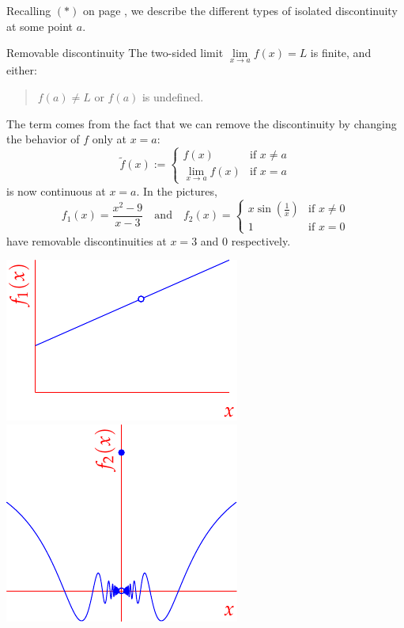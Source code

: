 Recalling $(\ast)$ on page \pageref{it:contlimit}, we describe the different types of isolated discontinuity at some point $a$.
\begin{description}
	\begin{minipage}[t]{0.65\linewidth}\vspace{0pt}
	\item[Removable discontinuity] The two-sided limit $\lim\limits_{x\to a}f(x)=L$ is finite, and either:
	\begin{quote}
	  $f(a)\neq L$ or $f(a)$ is undefined.
	\end{quote}
	The term comes from the fact that we can remove the discontinuity by changing the behavior of $f$ only at $x=a$:
	\[
		\tilde f(x):=
		\begin{cases}
			f(x)&\text{if }x\neq a\\
			\lim\limits_{x\to a}f(x)&\text{if }x=a
		\end{cases}
	\]
	is now continuous at $x=a$. In the pictures,
	\[
		f_1(x)=\frac{x^2-9}{x-3}
		\quad\text{and}\quad 
		f_2(x)=
		\begin{cases}
  		x\sin(\frac 1x)&\text{if }x\neq 0\\
  		1&\text{if }x=0
  	\end{cases}
  \]
	have removable discontinuities at $x=3$ and $0$ respectively.
	\end{minipage}
	\hfill
	\begin{minipage}[t]{0.34\linewidth}\vspace{0pt}
		\flushright\includegraphics{discont1}\\\vfill
		\includegraphics{discont2}

\end{minipage}
\end{description}
